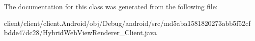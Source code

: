 The documentation for this class was generated from the following file\+:\begin{DoxyCompactItemize}
\item 
client/client/client.\+Android/obj/\+Debug/android/src/md5aba1581820273abb5f52cfbdde47dc28/Hybrid\+Web\+View\+Renderer\+\_\+\+Client.\+java\end{DoxyCompactItemize}
